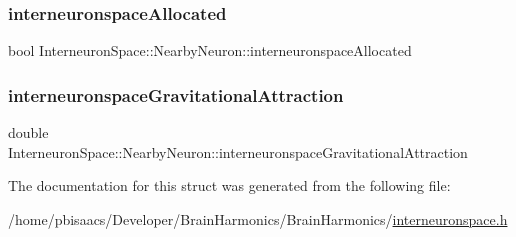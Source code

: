 \subsubsection{\texorpdfstring{interneuronspace\+Allocated}{interneuronspaceAllocated}}
{\footnotesize\ttfamily bool Interneuron\+Space\+::\+Nearby\+Neuron\+::interneuronspace\+Allocated}

\mbox{\label{structInterneuronSpace_1_1NearbyNeuron_a5cb224a1735249e1e50b934bdfd2ff3f}} 
\subsubsection{\texorpdfstring{interneuronspace\+Gravitational\+Attraction}{interneuronspaceGravitationalAttraction}}
{\footnotesize\ttfamily double Interneuron\+Space\+::\+Nearby\+Neuron\+::interneuronspace\+Gravitational\+Attraction}



The documentation for this struct was generated from the following file\+:\begin{DoxyCompactItemize}
\item 
/home/pbisaacs/\+Developer/\+Brain\+Harmonics/\+Brain\+Harmonics/\mbox{\hyperlink{interneuronspace_8h}{interneuronspace.\+h}}\end{DoxyCompactItemize}
